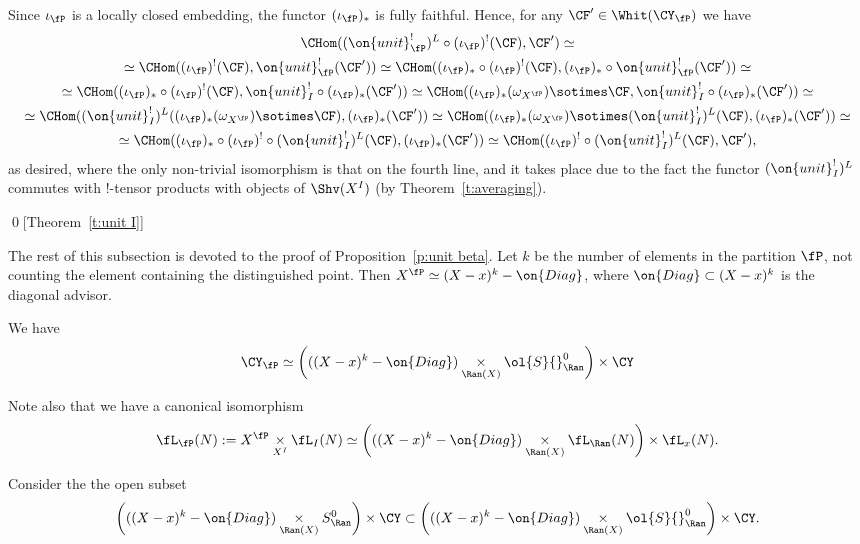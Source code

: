 \documentclass[9pt]{amsart}
\theoremstyle{definition}
\theoremstyle{remark}
\newcommand{\thmref}[1]{Theorem~\ref{#1}}
\newcommand{\propref}[1]{Proposition~\ref{#1}}
\numberwithin{equation}{section}
\begin{document}
Since $\iota_\fP$ is a locally closed embedding, the functor $(\iota_\fP)_*$ is fully faithful. Hence, 
for any $\CF'\in \Whit(\CY_\fP)$ we have
\begin{multline*}
\CHom((\on{unit}_\fP^!)^L\circ (\iota_\fP)^!(\CF),\CF')\simeq \\
\simeq \CHom((\iota_\fP)^!(\CF),\on{unit}_\fP^!(\CF'))
\simeq  \CHom((\iota_\fP)_*\circ (\iota_\fP)^!(\CF),(\iota_\fP)_*\circ  \on{unit}_\fP^!(\CF'))\simeq \\
\simeq\CHom((\iota_\fP)_*\circ (\iota_\fP)^!(\CF),\on{unit}_I^!\circ (\iota_\fP)_*(\CF'))\simeq
\CHom((\iota_\fP)_*(\omega_{X^\fP})\sotimes \CF,\on{unit}_I^!\circ (\iota_\fP)_*(\CF'))\simeq \\
\simeq \CHom((\on{unit}_I^!)^L((\iota_\fP)_*(\omega_{X^\fP})\sotimes \CF),(\iota_\fP)_*(\CF'))\simeq
\CHom((\iota_\fP)_*(\omega_{X^\fP})\sotimes (\on{unit}_I^!)^L(\CF),(\iota_\fP)_*(\CF'))\simeq \\
\simeq \CHom((\iota_\fP)_*\circ (\iota_\fP)^!\circ (\on{unit}_I^!)^L(\CF),(\iota_\fP)_*(\CF'))
\simeq \CHom((\iota_\fP)^!\circ (\on{unit}_I^!)^L(\CF),\CF'),
\end{multline*}
 as desired, where the only non-trivial isomorphism is that on the fourth line, and it takes place due to
 the fact the functor $(\on{unit}_I^!)^L$ commutes with !-tensor products with objects of $\Shv(X^I)$
 (by \thmref{t:averaging}).
 
\qed[\thmref{t:unit I}]

\sssec{}

The rest of this subsection is devoted to the proof of \propref{p:unit beta}. Let $k$ be the number of elements
in the partition $\fP$, not counting the element containing the distinguished point. Then $X^\fP\simeq (X-x)^k-\on{Diag}$,
where $\on{Diag}\subset (X-x)^k$ is the diagonal advisor. 

\medskip

We have
$$\CY_\fP\simeq \left(((X-x)^k-\on{Diag})\underset{\Ran(X)}\times \ol{S}{}^0_\Ran\right)\times \CY$$

\medskip

Note also that we have a canonical isomorphism 
$$\fL_\fP(N):=X^\fP\underset{X^I}\times \fL_I(N)\simeq 
\left(((X-x)^k-\on{Diag})\underset{\Ran(X)}\times \fL_\Ran(N)\right)\times \fL_x(N).$$

Consider the the open subset 
$$\left(((X-x)^k-\on{Diag})\underset{\Ran(X)}\times S^0_\Ran\right)\times \CY\subset 
\left(((X-x)^k-\on{Diag})\underset{\Ran(X)}\times \ol{S}{}^0_\Ran\right)\times \CY.$$
\end{document}
